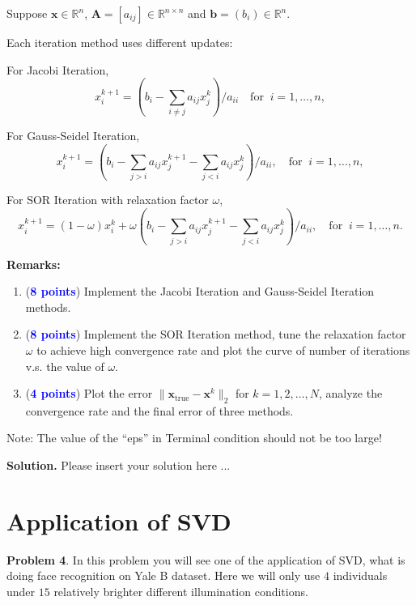 \documentclass[english,onecolumn]{IEEEtran}
\begin{document}
Suppose $\mathbf{x}\in\mathbb{R}^{n}$, $\mathbf{A}=[a_{ij}]\in\mathbb{R}^{n\times n}$ and $\mathbf{b}=(b_i)\in\mathbb{R}^{n}$.

Each iteration method uses different updates:

For Jacobi Iteration, 
\begin{equation*}
    x_i^{k+1} = (b_i - \sum_{i \neq j} a_{ij}x_j^k) / a_{ii} \quad \text{for }\ i = 1,\dots, n,
\end{equation*}

For Gauss-Seidel Iteration, 
\begin{equation*}
    x_i^{k+1} = (b_i - \sum_{j > i} a_{ij}x_j^{k+1} - \sum_{j < i} a_{ij}x_j^{k}) / a_{ii}, \quad \text{for }\ i = 1,\dots, n,
\end{equation*}

For SOR Iteration with relaxation factor $\omega$, 
\begin{equation*}
    x_i^{k+1} = (1-\omega) x_i^{k} + \omega \left(b_i - \sum_{j>i} a_{ij}x_j^{k+1} - \sum_{j<i} a_{ij}x_j^{k}\right) / a_{ii}, \quad \text{for }\ i = 1,\dots, n.
\end{equation*}

\textbf{Remarks:}
\begin{enumerate}
    \item (\textcolor{blue}{\textbf{8 points}}) Implement the Jacobi Iteration and Gauss-Seidel Iteration methods.
    \item (\textcolor{blue}{\textbf{8 points}}) Implement the SOR Iteration method, tune the relaxation factor $\omega$ to achieve high convergence rate and plot the curve of number of iterations v.s. the value of $\omega$.
    \item (\textcolor{blue}{\textbf{4 points}}) Plot the error $\|\mathbf{x}_{\mathrm{true}} - \mathbf{x}^k\|_2$ for $k=1,2,\dots,N$, analyze the convergence rate and the final error of three methods.
\end{enumerate}
Note: The value of the ``eps'' in Terminal condition should not be too large!



\noindent
\textbf{Solution.}
Please insert your solution here ...


\newpage
\section{Application of SVD}
\noindent\textbf{Problem 4}.
In this problem you will see one of the application of SVD, what is doing face recognition on Yale B dataset. Here we will only use $4$ individuals under $15$ relatively brighter different illumination conditions.
\end{document}
